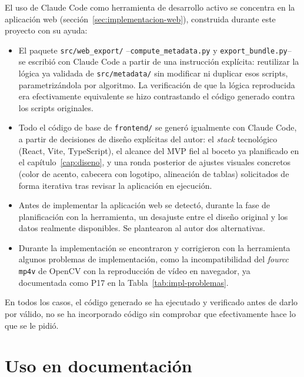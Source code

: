 El uso de Claude Code como herramienta de desarrollo activo se concentra en
la aplicación web (sección~\ref{sec:implementacion-web}), construida 
durante este proyecto con su ayuda:

\begin{itemize}
  \item El paquete \texttt{src/web\_export/} --\texttt{compute\_metadata.py}
        y \texttt{export\_bundle.py}-- se escribió con Claude Code a partir
        de una instrucción explícita: reutilizar la lógica ya validada de
        \texttt{src/metadata/} sin modificar ni duplicar esos scripts,
        parametrizándola por algoritmo. La verificación de que la lógica
        reproducida era efectivamente equivalente se hizo
        contrastando el código generado contra los scripts originales.
  \item Todo el código de base de \texttt{frontend/} se generó igualmente con Claude Code, a partir de
        decisiones de diseño explícitas del autor: el \emph{stack}
        tecnológico (React, Vite, TypeScript), el alcance del MVP fiel al
        boceto ya planificado en el capítulo~\ref{cap:diseno}, y una ronda
        posterior de ajustes visuales concretos (color de acento, cabecera
        con logotipo, alineación de tablas) solicitados de forma iterativa
        tras revisar la aplicación en ejecución.
  \item Antes de implementar la aplicación web se detectó, durante la fase
        de planificación con la herramienta, un desajuste entre el diseño
        original y los datos realmente disponibles. Se plantearon
        al autor dos alternativas.
  \item Durante la implementación se encontraron y corrigieron con la
        herramienta algunos problemas de implementación, como la incompatibilidad del
        \emph{fourcc} \texttt{mp4v} de OpenCV con la reproducción de vídeo
        en navegador, ya documentada como P17 en la
        Tabla~\ref{tab:impl-problemas}.
\end{itemize}

En todos los casos, el código generado se ha ejecutado y verificado
antes de darlo por válido, no
se ha incorporado código sin comprobar que efectivamente hace lo que se le
pidió.

\section{Uso en documentación}
\label{sec:ia-memoria}

